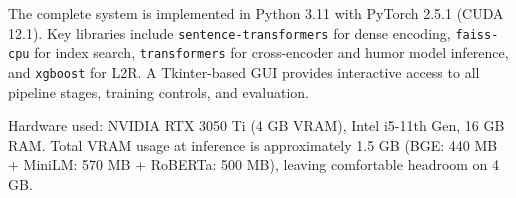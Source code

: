 The complete system is implemented in Python 3.11 with PyTorch 2.5.1 (CUDA 12.1). Key libraries include \texttt{sentence-transformers} for dense encoding, \texttt{faiss-cpu} for index search, \texttt{transformers} for cross-encoder and humor model inference, and \texttt{xgboost} for L2R. A Tkinter-based GUI provides interactive access to all pipeline stages, training controls, and evaluation.

Hardware used: NVIDIA RTX 3050 Ti (4 GB VRAM), Intel i5-11th Gen, 16 GB RAM. Total VRAM usage at inference is approximately 1.5 GB (BGE: 440 MB + MiniLM: 570 MB + RoBERTa: 500 MB), leaving comfortable headroom on 4 GB.
